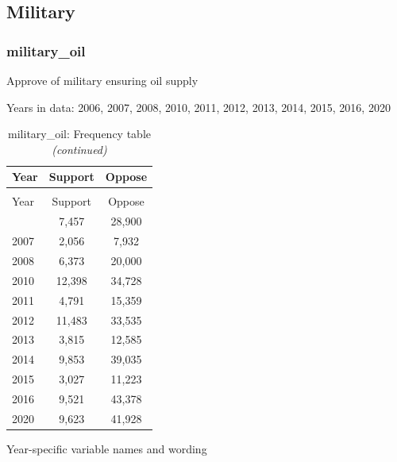 \documentclass[
  12pt]{article}
\begin{document}
\hypertarget{military}{%
\subsection{Military}\label{military}}

\hypertarget{military_oil}{%
\subsubsection{military\_oil}\label{military_oil}}

Approve of military ensuring oil supply

Years in data: 2006, 2007, 2008, 2010, 2011, 2012, 2013, 2014, 2015,
2016, 2020\begingroup\fontsize{10}{12}\selectfont

\begin{longtable}[t]{lcc}
\caption{\label{tab:unnamed-chunk-5}military\_oil: Frequency table}\\
\toprule
Year & Support & Oppose\\
\midrule
\endfirsthead
\caption[]{military\_oil: Frequency table \textit{(continued)}}\\
\toprule
Year & Support & Oppose\\
\midrule
\endhead

\endfoot
\bottomrule
\endlastfoot
2006 & 7,457 & 28,900\\
2007 & 2,056 & 7,932\\
2008 & 6,373 & 20,000\\
2010 & 12,398 & 34,728\\
2011 & 4,791 & 15,359\\
2012 & 11,483 & 33,535\\
2013 & 3,815 & 12,585\\
2014 & 9,853 & 39,035\\
2015 & 3,027 & 11,223\\
2016 & 9,521 & 43,378\\
2020 & 9,623 & 41,928\\*
\end{longtable}
\endgroup{}

Year-specific variable names and
wording\begingroup\fontsize{11}{13}\selectfont
\end{document}
